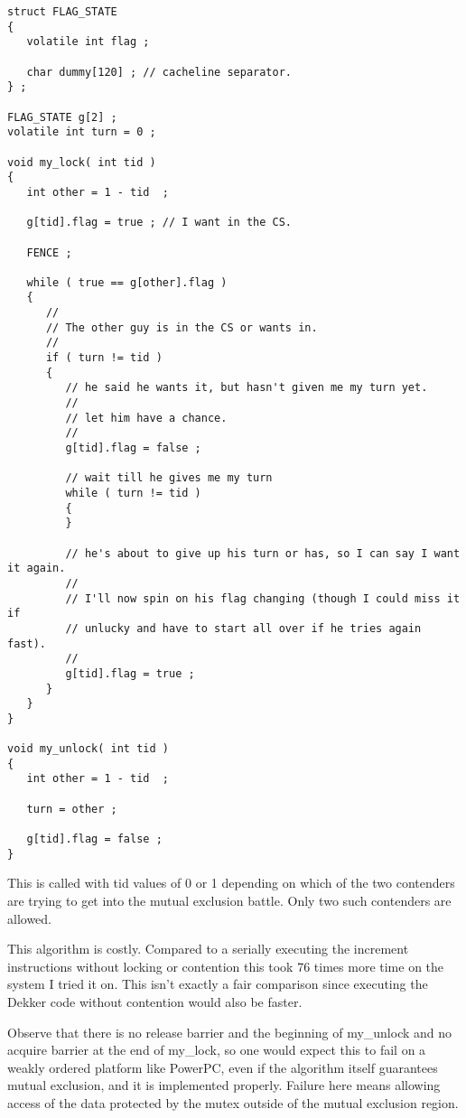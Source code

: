 \begin{lstlisting}
struct FLAG_STATE
{
   volatile int flag ;

   char dummy[120] ; // cacheline separator.
} ;

FLAG_STATE g[2] ;
volatile int turn = 0 ;

void my_lock( int tid )
{
   int other = 1 - tid  ;

   g[tid].flag = true ; // I want in the CS.

   FENCE ;

   while ( true == g[other].flag )
   {
      // 
      // The other guy is in the CS or wants in.
      //
      if ( turn != tid )
      {
         // he said he wants it, but hasn't given me my turn yet.
         // 
         // let him have a chance.
         //
         g[tid].flag = false ;

         // wait till he gives me my turn
         while ( turn != tid )
         {
         }

         // he's about to give up his turn or has, so I can say I want it again.
         // 
         // I'll now spin on his flag changing (though I could miss it if
         // unlucky and have to start all over if he tries again fast).
         //
         g[tid].flag = true ;
      }
   }
}

void my_unlock( int tid )
{
   int other = 1 - tid  ;

   turn = other ;

   g[tid].flag = false ;
}
\end{lstlisting}

This is called with tid values of 0 or 1 depending on which of the two contenders are trying to get into the mutual exclusion battle.  Only two such contenders are allowed.

This algorithm is costly.  Compared to a serially executing the increment instructions without locking or contention this took 76 times more time on the system I tried it on.  This isn't exactly a fair comparison since executing the Dekker code without contention would also be faster.

Observe that there is no release barrier and the beginning of my\_unlock and no acquire barrier at the end of my\_lock, so one would expect this to fail on a weakly ordered platform like PowerPC, even if the algorithm itself guarantees mutual exclusion, and it is implemented properly.  Failure here means allowing access of the data protected by the mutex outside of the mutual exclusion region.

